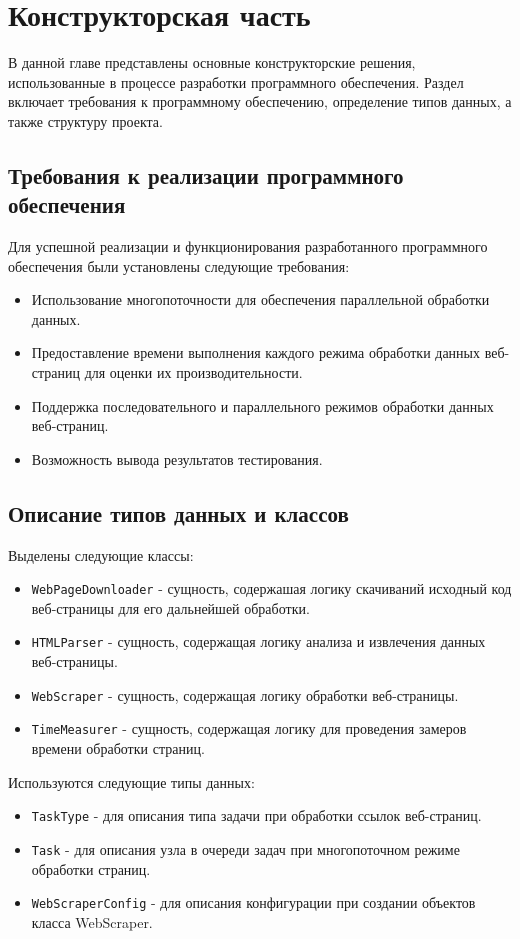 \chapter{Конструкторская часть}
В данной главе представлены основные конструкторские решения, использованные в процессе разработки программного обеспечения. Раздел включает требования к программному обеспечению, определение типов данных, а также структуру проекта.

\section{Требования к реализации программного обеспечения}
Для успешной реализации и функционирования разработанного программного обеспечения были установлены следующие требования:
\begin{itemize}
	\item Использование многопоточности для обеспечения параллельной обработки данных.
	\item Предоставление времени выполнения каждого режима обработки данных веб-страниц для оценки их производительности.
	\item Поддержка последовательного и параллельного режимов обработки данных веб-страниц.
	\item Возможность вывода результатов тестирования.
\end{itemize}

\section{Описание типов данных и классов}
Выделены следующие классы:
\begin{itemize}
	\item \texttt{WebPageDownloader} - сущность, содержашая логику скачиваний исходный код веб-страницы для его дальнейшей обработки.
	\item \texttt{HTMLParser} - сущность, содержащая логику анализа и извлечения данных веб-страницы.
	\item \texttt{WebScraper} - сущность, содержащая логику обработки веб-страницы.
	\item \texttt{TimeMeasurer} - сущность, содержащая логику для проведения замеров времени обработки страниц.
\end{itemize}

Используются следующие типы данных:
\begin{itemize}
	\item \texttt{TaskType} - для описания типа задачи при обработки ссылок веб-страниц.
	\item \texttt{Task} - для описания узла в очереди задач при многопоточном режиме обработки страниц.
	\item \texttt{WebScraperConfig} - для описания конфигурации при создании объектов класса WebScraper.
\end{itemize}

